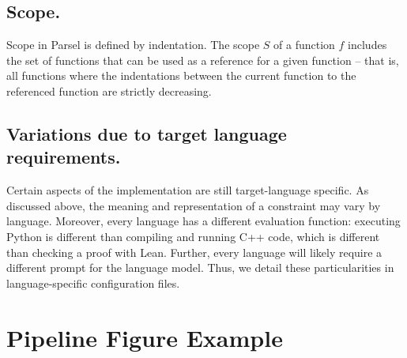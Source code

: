 \subsection{Scope.}
Scope in Parsel is defined by indentation. The scope $S$ of a function $f$ includes the set of functions that can be used as a reference for a given function -- that is, all functions where the indentations between the current function to the referenced function are strictly decreasing.

\subsection{Variations due to target language requirements.}
Certain aspects of the implementation are still target-language specific. As discussed above, the meaning and representation of a constraint may vary by language. Moreover, every language has a different evaluation function: executing Python is different than compiling and running C++ code, which is different than checking a proof with Lean. Further, every language will likely require a different prompt for the language model. Thus, we detail these particularities in language-specific configuration files.

\clearpage
\newpage

\section{Pipeline Figure Example}
\label{pipelineappendix}

